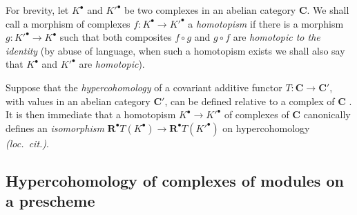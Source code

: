 \begin{env}[6.1.4]
\label{III.6.1.4}
For brevity, let $K^\bullet$ and $K'^\bullet$ be two complexes in
an abelian category $\boldsymbol{C}$.  We shall call a morphism of
complexes $f:K^\bullet\longrightarrow K'^\bullet$
a \emph{homotopism} if there is a morphism
$g:K'^\bullet\to K^\bullet$ such that both composites
$f\circ g$ and $g\circ f$ are \emph{homotopic to the identity} (by abuse
of language, when such a homotopism exists we shall also say that
$K^\bullet$ and $K'^\bullet$ are \emph{homotopic}).

Suppose that the \emph{hypercohomology} of a covariant additive functor
$T:\boldsymbol{C}\to\boldsymbol{C}'$, with values in an abelian category
$\boldsymbol{C}'$, can be defined relative to a complex of
$\boldsymbol{C}$ .  It is then immediate that a
homotopism $K^\bullet\to K'^\bullet$ of complexes of $\boldsymbol{C}$ canonically defines an
\emph{isomorphism} $\mathbf{R}^\bullet T(K^\bullet)
\to
\mathbf{R}^\bullet T(K'^\bullet)$
on hypercohomology \emph{(loc.\ cit.)}.
\end{env}


\subsection{Hypercohomology of complexes of modules on a prescheme}
\label{subsection:III.6.2}

